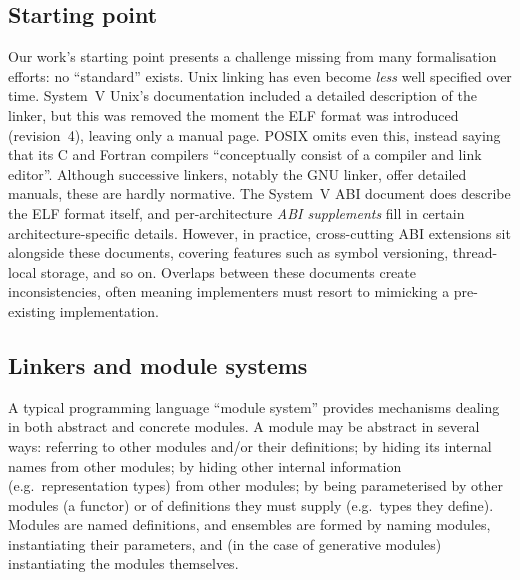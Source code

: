 \subsection{Starting point}

Our work's starting point presents a challenge missing from many formalisation efforts:
no ``standard'' exists.
Unix linking has even become \emph{less} well specified over time.
System~V Unix's documentation included a detailed description of the linker,
but this was removed the moment the ELF format was introduced (revision~4), 
leaving only a manual page.
POSIX \citep{} omits even this, instead saying that its C and Fortran compilers 
``conceptually consist of a compiler and link editor''.
Although successive linkers, notably the GNU linker, offer detailed manuals, 
these are hardly normative.
The System~V ABI document \citep{} does describe the ELF format itself,
and per-architecture \emph{ABI supplements} fill in certain architecture-specific
details.
However, in practice, cross-cutting ABI extensions sit alongside these documents, covering features such as symbol versioning, thread-local storage, and so on.
Overlaps between these documents create inconsistencies, often meaning implementers must resort to mimicking a pre-existing implementation.

\subsection{Linkers and module systems}

A typical programming language ``module system'' provides mechanisms 
dealing in both abstract and concrete modules. 
A module may be abstract in several ways: 
referring to other modules and/or their definitions;
by hiding its internal names from other modules;
by hiding other internal information (e.g.\ representation types) from other modules;
by being parameterised by other modules (a functor) 
     or of definitions they must supply (e.g.\ types they define).
Modules are named definitions,
and ensembles are formed by naming modules, instantiating their parameters,
and (in the case of generative modules) instantiating the modules themselves.


